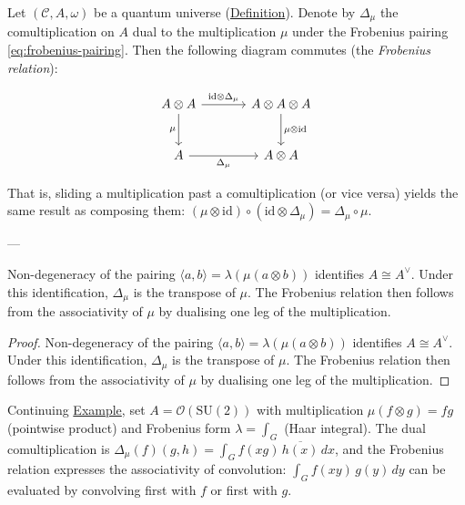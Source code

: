 \begin{proposition}
  \label{prop:frobenius-relation}
Let $(\mathcal{C}, A, \omega)$ be a quantum universe
(\hyperref[def:quantum-universe]{Definition}). Denote by $\Delta_\mu$ the
comultiplication on $A$ dual to the multiplication $\mu$ under the
Frobenius pairing \eqref{eq:frobenius-pairing}. Then the following
diagram commutes (the \emph{Frobenius relation}):

\begin{equation}\label{eq:frobenius-relation}
\begin{tikzcd}[row sep=2.5em, column sep=3.5em]
  A \otimes A
    \ar[r, "\mathrm{id} \otimes \Delta_\mu"]
    \ar[d, "\mu"']
  & A \otimes A \otimes A
    \ar[d, "\mu \otimes \mathrm{id}"]
  \\
  A \ar[r, "\Delta_\mu"']
  & A \otimes A
\end{tikzcd}
\end{equation}

That is, sliding a multiplication past a comultiplication (or vice versa)
yields the same result as composing them:
$(\mu \otimes \mathrm{id}) \circ (\mathrm{id} \otimes \Delta_\mu)
= \Delta_\mu \circ \mu$.

---

Non-degeneracy of the pairing
$\langle a, b \rangle = \lambda(\mu(a \otimes b))$ identifies
$A \cong A^{\vee}$. Under this identification, $\Delta_\mu$ is the
transpose of $\mu$. The Frobenius relation then follows from the
associativity of $\mu$ by dualising one leg of the multiplication.
\end{proposition}
\begin{proof}
Non-degeneracy of the pairing
$\langle a, b \rangle = \lambda(\mu(a \otimes b))$ identifies
$A \cong A^{\vee}$. Under this identification, $\Delta_\mu$ is the
transpose of $\mu$. The Frobenius relation then follows from the
associativity of $\mu$ by dualising one leg of the multiplication.
\end{proof}

\begin{example}
  \label{ex:frobenius-su2}
Continuing \hyperref[ex:qou-su2]{Example}, set
$A = \mathcal{O}(\mathrm{SU}(2))$ with multiplication
$\mu(f \otimes g) = fg$ (pointwise product) and Frobenius form
$\lambda = \int_G$ (Haar integral). The dual comultiplication is
$\Delta_\mu(f)(g,h) = \int_G f(xg)\,\overline{h(x)}\,dx$, and the
Frobenius relation expresses the associativity of convolution:
$\int_G f(xy)\,g(y)\,dy$ can be evaluated by convolving first with $f$
or first with $g$.
\end{example}

